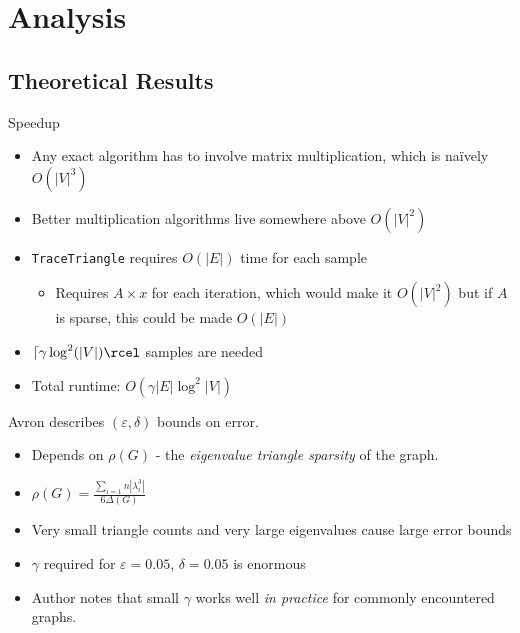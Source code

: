 \documentclass{beamer}
\begin{document}
\section{Analysis}

\subsection{Theoretical Results}

\begin{frame}{Speedup}
    \begin{itemize}
        \item Any exact algorithm has to involve matrix multiplication, which is na\"ively $O(|V|^3)$
        \item Better multiplication algorithms live somewhere above $O(|V|^2)$
        \item \texttt{TraceTriangle} requires $O(|E|)$ time for each sample
        \begin{itemize}
            \item Requires $A \times x$ for each iteration, which would make it $O(|V|^2)$ but if $A$ is sparse, this could be made $O(|E|)$
        \end{itemize}
        \item $\lceil \gamma \log^2(|V|) \rcel$ samples are needed
        \item Total runtime: $O(\gamma |E| \log^2 |V| )$
    \end{itemize}
\end{frame}

\begin{frame}
    Avron describes $(\varepsilon, \delta)$ bounds on error.
    
    \begin{itemize}
        \item Depends on $\rho(G)$ - the \textit{eigenvalue triangle sparsity} of the graph.
        \item $\rho(G) = \frac{\sum_{i=1}{n} |\lambda_i^3|}{6 \Delta(G)}$
        \item Very small triangle counts and very large eigenvalues cause large error bounds
        \item $\gamma$ required for $\varepsilon = 0.05$, $\delta = 0.05$ is enormous
        \item Author notes that small $\gamma$ works well \textit{in practice} for commonly encountered graphs.
    \end{itemize}
\end{frame}
\end{document}
